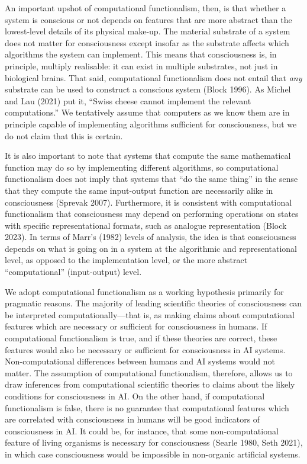 \documentclass[12pt]{article}
\begin{document}
An important upshot of computational functionalism, then, is that whether a system is conscious or not depends on features that are more abstract than the lowest-level details of its physical make-up. The material substrate of a system does not matter for consciousness except insofar as the substrate affects which algorithms the system can implement. This means that consciousness is, in principle, multiply realisable: it can exist in multiple substrates, not just in biological brains. That said, computational functionalism does not entail that  \textit{any} substrate can be used to construct a conscious system (Block 1996). As Michel and Lau (2021) put it, ``Swiss cheese cannot implement the relevant computations.'' We tentatively assume that computers as we know them are in principle capable of implementing algorithms sufficient for consciousness, but we do not claim that this is certain.

It is also important to note that systems that compute the same mathematical function may do so by implementing different algorithms, so computational functionalism does not imply that systems that ``do the same thing'' in the sense that they compute the same input-output function are necessarily alike in consciousness (Sprevak 2007). Furthermore, it is consistent with computational functionalism that consciousness may depend on performing operations on states with specific representational formats, such as analogue representation (Block 2023). In terms of Marr’s (1982) levels of analysis, the idea is that consciousness depends on what is going on in a system at the algorithmic and representational level, as opposed to the implementation level, or the more abstract ``computational'' (input-output) level.

We adopt computational functionalism as a working hypothesis primarily for pragmatic reasons. The majority of leading scientific theories of consciousness can be interpreted computationally—that is, as making claims about computational features which are necessary or sufficient for consciousness in humans. If computational functionalism is true, and if these theories are correct, these features would also be necessary or sufficient for consciousness in AI systems. Non-computational differences between humans and AI systems would not matter. The assumption of computational functionalism, therefore, allows us to draw inferences from computational scientific theories to claims about the likely conditions for consciousness in AI. On the other hand, if computational functionalism is false, there is no guarantee that computational features which are correlated with consciousness in humans will be good indicators of consciousness in AI. It could be, for instance, that some non-computational feature of living organisms is necessary for consciousness (Searle 1980, Seth 2021), in which case consciousness would be impossible in non-organic artificial systems.
\end{document}
